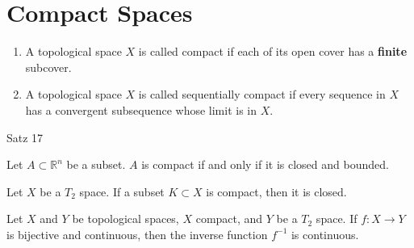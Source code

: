 \chapter{Compact Spaces}
\begin{defbox}
    \begin{definition}
        \begin{enumerate}
            \item A {\color{mathobj}topological space} \(X\) is called {\color{maththen}compact} if each of its {\color{mathif}open cover} has a \textbf{finite} {\color{mathif}subcover}.
            \item A {\color{mathobj}topological space} \(X\) is called {\color{maththen}sequentially compact} if every {\color{mathif}sequence} in \(X\) has a {\color{mathif}convergent subsequence} whose limit is in \(X\).
        \end{enumerate}
    \end{definition}
\end{defbox}
%
\begin{thmbox}
    \begin{theorem}
        Satz 17
    \end{theorem}
\end{thmbox}
%
\begin{thmbox}
    \begin{theorem}
        Let \(A \subset \mathbb{R}^n\) be a subset. \(A\) is compact if and only if it is closed and bounded.
    \end{theorem}
\end{thmbox}
%
\begin{thmbox}
    \begin{theorem}
        Let \(X\) be a \(T_2\) space. If a subset \(K \subset X\) is compact, then it is closed.
    \end{theorem}
\end{thmbox}
%
\begin{thmbox}
    \begin{theorem}
        Let \(X\) and \(Y\) be topological spaces, \(X\) compact, and \(Y\) be a \(T_2\) space. If \(f: X \longrightarrow Y\) is bijective and continuous, then the inverse function \(f^{-1}\) is continuous.
    \end{theorem}
\end{thmbox}
\newpage
